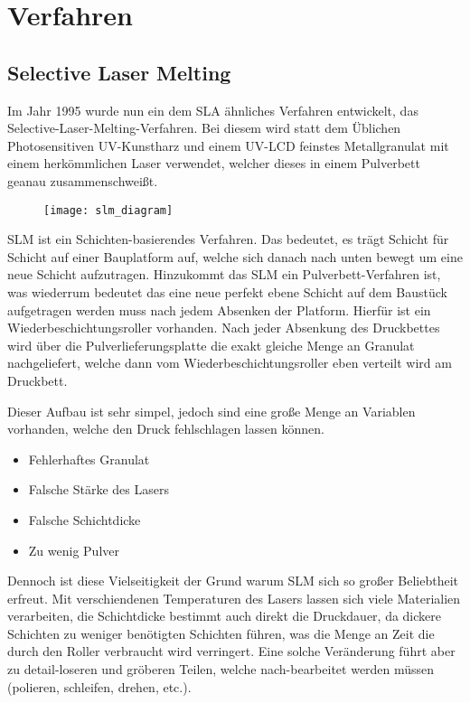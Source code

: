\documentclass[main.tex]{subfiles}
\begin{document}
\section{Verfahren}
\subsection{Selective Laser Melting}
Im Jahr 1995 wurde nun ein dem SLA ähnliches Verfahren entwickelt, das Selective-Laser-Melting-Verfahren. Bei diesem wird statt dem Üblichen Photosensitiven UV-Kunstharz und einem UV-LCD feinstes Metallgranulat mit einem herkömmlichen Laser verwendet, welcher dieses in einem Pulverbett geanau zusammenschweißt. \parencite{3FAKTUR_1}
\begin{figure}[H]
\begin{center}
	\texttt{[image: slm\_diagram]}
	\label{img:slm_diagram}
\end{center}
\end{figure}	
SLM ist ein Schichten-basierendes Verfahren. Das bedeutet, es trägt Schicht für Schicht auf
einer Bauplatform auf, welche sich danach nach unten bewegt um eine neue Schicht aufzutragen. 
Hinzukommt das SLM ein Pulverbett-Verfahren ist, was wiederrum bedeutet das eine neue perfekt ebene Schicht auf dem Baustück aufgetragen werden muss nach jedem Absenken der Platform.
Hierfür ist ein Wiederbeschichtungsroller vorhanden. Nach jeder Absenkung des Druckbettes wird über die Pulverlieferungsplatte die exakt gleiche Menge an Granulat nachgeliefert, welche dann vom Wiederbeschichtungsroller eben verteilt wird am Druckbett. 

Dieser Aufbau ist sehr simpel, jedoch sind eine große Menge an Variablen vorhanden, welche den Druck fehlschlagen lassen können.
\begin{itemize}
\item Fehlerhaftes Granulat
\item Falsche Stärke des Lasers
\item Falsche Schichtdicke
\item Zu wenig Pulver
\end{itemize}
Dennoch ist diese Vielseitigkeit der Grund warum SLM sich so großer Beliebtheit erfreut. Mit verschiendenen Temperaturen des Lasers lassen sich viele Materialien verarbeiten, die Schichtdicke bestimmt auch direkt die Druckdauer, da dickere Schichten zu weniger benötigten Schichten führen, was die Menge an Zeit die durch den Roller verbraucht wird verringert.
Eine solche Veränderung führt aber zu detail-loseren und gröberen Teilen, welche  nach-bearbeitet werden müssen (polieren, schleifen, drehen, etc.). 
\end{document}
